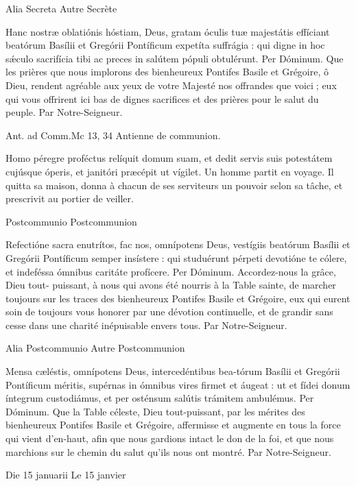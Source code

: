 \begin{paracol}{2}
Alia Secreta
\switchcolumn
Autre Secrète
\switchcolumn*

Hanc nostræ oblatiónis hóstiam,  Deus, gratam óculis tuæ majestátis effíciant beatórum Basílii et Gregórii Pontíficum expetíta suffrágia : qui digne in hoc sǽculo sacrifícia tibi ac preces in salútem pópuli obtulérunt. Per Dóminum.
\switchcolumn
Que les prières que nous implorons  des bienheureux Pontifes Basile et Grégoire, ô Dieu, rendent agréable aux yeux de votre Majesté nos offrandes que voici ; eux qui vous offrirent ici bas de dignes sacrifices et des prières pour le salut du peuple. Par Notre-Seigneur.
\switchcolumn*

Ant. ad Comm.\hfill Mc 13, 34
\switchcolumn
Antienne de communion.
\switchcolumn*

Homo péregre proféctus relíquit domum suam, et dedit servis suis potestátem cujúsque óperis, et janitóri præcépit ut vígilet.
\switchcolumn
Un homme partit en voyage. Il quitta sa maison, donna à chacun de ses serviteurs un pouvoir selon sa tâche, et prescrivit au portier de veiller.
\switchcolumn*

Postcommunio
\switchcolumn
Postcommunion
\switchcolumn*

Refectióne sacra enutrítos, fac  nos, omnípotens Deus, vestígiis beatórum Basílii et Gregórii Pontíficum semper insístere : qui studuérunt pérpeti devotióne te cólere, et indeféssa ómnibus caritáte profícere. Per Dóminum.
\switchcolumn
Accordez-nous la grâce, Dieu tout- puissant, à nous qui avons été nourris à la Table sainte, de marcher toujours sur les traces des bienheureux Pontifes Basile et Grégoire, eux qui eurent soin de toujours vous  honorer par une dévotion continuelle, et de grandir sans cesse dans une charité inépuisable envers tous. Par Notre-Seigneur.
\switchcolumn*

Alia Postcommunio
\switchcolumn
Autre Postcommunion
\switchcolumn*

Mensa cæléstis, omnípotens  Deus, intercedéntibus bea-tórum Basílii et Gregórii Pontíficum méritis, supérnas in ómnibus vires firmet et áugeat : ut et fídei donum íntegrum custodiámus, et per osténsum salútis trámitem ambulémus. Per Dóminum.
\switchcolumn
Que la Table céleste, Dieu tout-puissant, par les mérites des bienheureux Pontifes Basile et Grégoire, affermisse et augmente en tous la force qui vient d’en-haut, afin que nous gardions intact le don de la foi, et que nous marchions sur le chemin du salut qu’ils nous ont montré. Par Notre-Seigneur.
\switchcolumn*

Die 15 januarii
\switchcolumn
Le 15 janvier
\switchcolumn*


\end{paracol}
